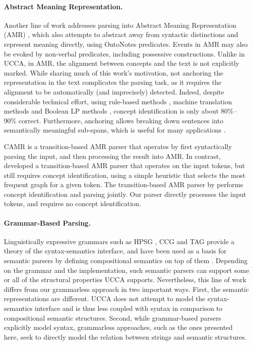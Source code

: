 \documentclass[11pt,a4paper]{article}
\begin{document}
\paragraph{Abstract Meaning Representation.}
Another line of work addresses parsing into Abstract Meaning Representation (AMR)
\cite{flanigan2014discriminative,vanderwende2015amr,pust2015parsing,artzi2015broad},
which also attempts to abstract away from syntactic distinctions
and represent meaning directly, using OntoNotes predicates.
Events in AMR may also be evoked by non-verbal predicates, including possessive constructions.
Unlike in UCCA, in AMR, the alignment between concepts and the text is not explicitly marked.
While sharing much of this work's motivation, not anchoring the representation in the text
complicates the parsing task, as it requires
the alignment to be automatically (and imprecisely) detected.
Indeed, despite considerable technical effort,
using rule-based methods \cite{flanigan2014discriminative}, machine
translation methods \cite{pourdamghani2014aligning} and Boolean LP methods
\cite{werling2015robust}, concept identification is only about 80\%--90\% correct.
Furthermore, anchoring allows breaking down sentences into semantically meaningful sub-spans,
which is useful for many applications \cite{fernandez2015parsing,birch2016hume}.

CAMR \cite{wang-xue-pradhan:2015:ACL-IJCNLP,wang2015transition,wang-EtAl:2016:SemEval,goodman2016noise}
is a transition-based AMR parser that operates by first syntactically parsing the input,
and then processing the result into AMR.
In contrast,
\citet{damonte2016incremental} developed a transition-based AMR parser that
operates on the input tokens, but still requires concept identification, using
a simple heuristic that selects the most frequent graph for a given token.
The transition-based AMR parser by \citet{zhou2016amr} performs concept identification
and parsing jointly.
Our parser directly processes the input tokens, and requires no concept identification.

\paragraph{Grammar-Based Parsing.}
Linguistically expressive grammars such as HPSG \cite{PandS:94}, CCG \cite{Steedman:00} and TAG \cite{Joshi:97}
provide a theory of the syntax-semantics interface, and have been used as a basis for semantic parsers
by defining compositional semantics on top of them \cite[among others]{Flic:00,bos2005towards}.
Depending on the grammar and the implementation, such semantic parsers can support
some or all of the structural properties UCCA supports.
Nevertheless, this line of work differs from our grammarless approach in two important ways.
First, the semantic representations are different. UCCA does not attempt to model
the syntax-semantics interface and is thus less coupled with syntax in comparison to
compositional semantic structures.
Second, while grammar-based parsers explicitly model syntax, grammarless
approaches, such as the ones presented here, seek to directly model the relation between
strings and semantic structures.
\end{document}

